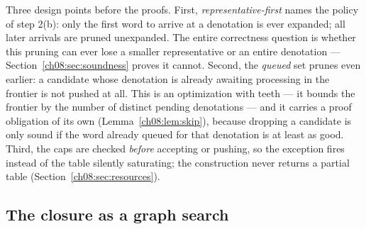 Three design points before the proofs. First, \emph{representative-first}
names the policy of step 2(b): only the first word to arrive at a denotation
is ever expanded; all later arrivals are pruned unexpanded. The entire
correctness question is whether this pruning can ever lose a smaller
representative or an entire denotation --- Section~\ref{ch08:sec:soundness}
proves it cannot. Second, the \emph{queued} set prunes even earlier: a
candidate whose denotation is already awaiting processing in the frontier is
not pushed at all. This is an optimization with teeth --- it bounds the
frontier by the number of distinct pending denotations --- and it carries a
proof obligation of its own (Lemma~\ref{ch08:lem:skip}), because dropping a
candidate is only sound if the word already queued for that denotation is at
least as good. Third, the caps are checked \emph{before} accepting or
pushing, so the exception fires instead of the table silently saturating;
the construction never returns a partial table
(Section~\ref{ch08:sec:resources}).

\subsection{The closure as a graph search}\label{ch08:sec:graphview}

